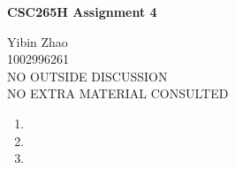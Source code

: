 \documentclass[10pt]{article}
\begin{document}
\begin{center}
{\bf \Larger \bf CSC265H Assignment 4} \\
\end{center}

\noindent
Yibin Zhao\\
1002996261\\
NO OUTSIDE DISCUSSION\\
NO EXTRA MATERIAL CONSULTED\\

\begin{comment}
Consider the following algorithm:
INCREMENT(C)
choose X $\in \{0, 1\}$ such that Prob[X=1] = $frac{1}{2^C}$
if X=1 then C $\gets$ C+1
Suppose that C is initially 0.
\end{comment}

\begin{enumerate}

\begin{comment}
1. For each $v \in \{0, 1, 2, 3, 4\}$, what is the probablity that C = v after
INCREMENT(C) has been called 4 times? 
\end{comment}
\item

\begin{comment}
2. Write a recurrence that describes the probablity $P_{t, v}$ that C = v after
INCREMENT(C) has been called t times, Explain your answer.
\end{comment}
\item

\begin{comment}
3. Prove that if INCREMENT(C) is called t times, then the expected value of
$2^C$ is t+1
\end{comment}
\item

\end{enumerate}
\end{document}
